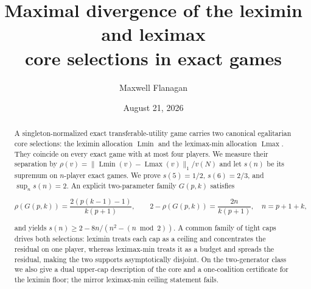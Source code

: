 \documentclass[11pt]{article}
\title{Maximal divergence of the leximin and leximax\\
core selections in exact games}
\author{Maxwell Flanagan}
\date{August 21, 2026}
\newcommand{\Lmin}{\operatorname{Lmin}}
\newcommand{\Lmax}{\operatorname{Lmax}}
\begin{document}
\maketitle

\begin{abstract}
A singleton-normalized exact transferable-utility game carries two canonical
egalitarian core selections: the leximin allocation $\Lmin$ and the
leximax-min allocation $\Lmax$.  They coincide on every exact game with at
most four players.  We measure their separation by
$\rho(v)=\|\Lmin(v)-\Lmax(v)\|_1/v(N)$ and let $s(n)$ be its supremum on
$n$-player exact games.  We prove $s(5)=1/2$, $s(6)=2/3$, and
$\sup_n s(n)=2$.  An explicit two-parameter family $G(p,k)$ satisfies

\[
 \rho(G(p,k))=\frac{2(p(k-1)-1)}{k(p+1)},\qquad
 2-\rho(G(p,k))=\frac{2n}{k(p+1)},\quad n=p+1+k,
\]

and yields $s(n)\ge 2-8n/(n^2-(n\bmod2))$.  A common family of tight caps
drives both selections: leximin treats each cap as a ceiling and concentrates
the residual on one player, whereas leximax-min treats it as a budget and
spreads the residual, making the two supports asymptotically disjoint.  On
the two-generator class we also give a dual upper-cap description of the
core and a one-coalition certificate for the leximin floor; the mirror
leximax-min ceiling statement fails.


\end{abstract}
\end{document}
